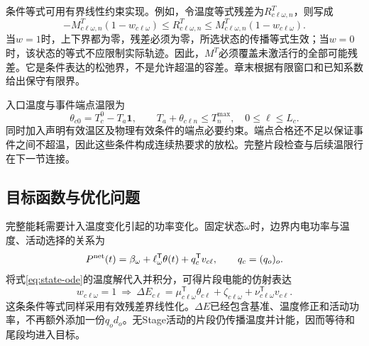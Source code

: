 条件等式可用有界线性约束实现。例如，令温度等式残差为\(R^T_{c\ell\omega,n}\)，则写成
\begin{equation}
-M^T_{c\ell\omega,n}(1-w_{c\ell\omega})
\le R^T_{c\ell\omega,n}
\le M^T_{c\ell\omega,n}(1-w_{c\ell\omega}).
\label{eq:thermal-bigM}
\end{equation}
当\(w=1\)时，上下界都为零，残差必须为零，所选状态的传播等式生效；当\(w=0\)时，该状态的等式不应限制实际轨迹。因此，\(M^T\)必须覆盖未激活行的全部可能残差。它是条件表达的松弛界，不是允许超温的容差。章末根据有限窗口和已知系数给出保守有限界。

入口温度与事件端点温限为
\begin{equation}
\theta_{c0}=T_c^0-T_a\mathbf1,\qquad
T_a+\theta_{c\ell n}\le T_n^{\max},\quad 0\le\ell\le L_c.
\label{eq:event-temperature}
\end{equation}
同时加入声明有效温区及物理有效条件的端点必要约束。端点合格还不足以保证事件之间不超温，因此这些条件构成连续热要求的放松。完整片段检查与后续温限行在下一节连接。

\subsection{目标函数与优化问题}

完整能耗需要计入温度变化引起的功率变化。固定状态\(\omega\)时，边界内电功率与温度、活动选择的关系为
\begin{equation}
P^{\rm net}(t)=\beta_\omega+\ell_\omega^{\mathsf T}\theta(t)
+q_c^{\mathsf T}v_{c\ell},\qquad q_c=(q_o)_o.
\label{eq:state-power}
\end{equation}
将式\eqref{eq:state-ode}的温度解代入并积分，可得片段电能的仿射表达
\begin{equation}
w_{c\ell\omega}=1\ \Longrightarrow\
\Delta E_{c\ell}=\mu_{c\ell\omega}^{\mathsf T}\theta_{c\ell}
+\zeta_{c\ell\omega}+\nu_{c\ell\omega}^{\mathsf T}v_{c\ell}.
\label{eq:energy-transition}
\end{equation}
这条条件等式同样采用有效残差界线性化。\(\Delta E\)已经包含基准、温度修正和活动功率，不再额外添加一份\(q_od_o\)。无Stage活动的片段仍传播温度并计能，因而等待和尾段均进入目标。

